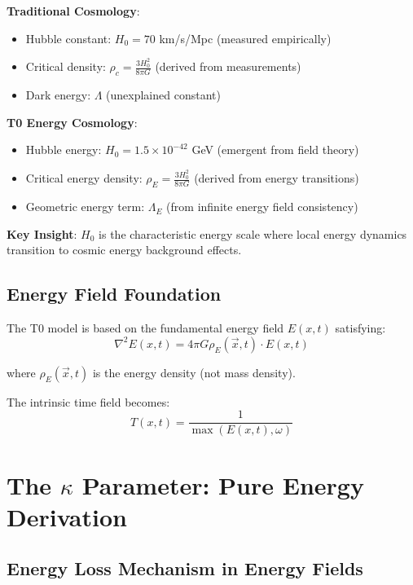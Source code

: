 \documentclass[12pt,a4paper]{article}
\newcommand{\Tfield}{T(x,t)}
\newcommand{\Efield}{E(x,t)}
\begin{document}
	\textbf{Traditional Cosmology}:
	\begin{itemize}
		\item Hubble constant: $H_0 = 70$ km/s/Mpc (measured empirically)
		\item Critical density: $\rho_c = \frac{3H_0^2}{8\pi G}$ (derived from measurements)
		\item Dark energy: $\Lambda$ (unexplained constant)
	\end{itemize}
	
	\textbf{T0 Energy Cosmology}:
	\begin{itemize}
		\item Hubble energy: $H_0 = 1.5 \times 10^{-42}$ GeV (emergent from field theory)
		\item Critical energy density: $\rho_E = \frac{3H_0^2}{8\pi G}$ (derived from energy transitions)
		\item Geometric energy term: $\Lambda_E$ (from infinite energy field consistency)
	\end{itemize}
	
	\textbf{Key Insight}: $H_0$ is the characteristic energy scale where local energy dynamics transition to cosmic energy background effects.
	
	\subsection{Energy Field Foundation}
	
	The T0 model is based on the fundamental energy field $\Efield$ satisfying:
	\begin{equation}
		\boxed{\nabla^2 \Efield = 4\pi G \rho_E(\vec{x},t) \cdot \Efield}
		\label{eq:energy_field_equation}
	\end{equation}
	
	where $\rho_E(\vec{x},t)$ is the energy density (not mass density).
	
	The intrinsic time field becomes:
	\begin{equation}
		\boxed{\Tfield = \frac{1}{\max(\Efield, \omega)}}
		\label{eq:energy_time_field}
	\end{equation}
	
	\section{The $\kappa$ Parameter: Pure Energy Derivation}
	
	\subsection{Energy Loss Mechanism in Energy Fields}
	
\end{document}
